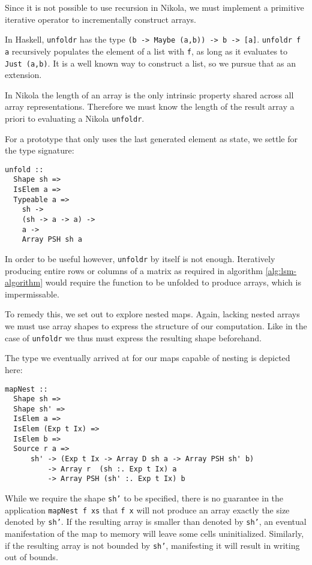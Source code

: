 Since it is not possible to use recursion in Nikola, we must implement a
primitive iterative operator to incrementally construct arrays.

In Haskell, \texttt{unfoldr} has the type \texttt{(b -> Maybe (a,b)) -> b ->
[a]}.  \texttt{unfoldr f a} recursively populates the element of a list with
\texttt{f}, as long as it evaluates to \texttt{Just (a,b)}. It is a well known
way to construct a list, so we pursue that as an extension.

In Nikola the length of an array is the only intrinsic property shared across
all array representations. Therefore we must know the length of the result array a
priori to evaluating a Nikola \texttt{unfoldr}.

For a prototype that only uses the last generated element as state, we settle
for the type signature:
\begin{verbatim}
unfold ::
  Shape sh =>
  IsElem a =>
  Typeable a =>
    sh ->
    (sh -> a -> a) ->
    a ->
    Array PSH sh a
\end{verbatim}

In order to be useful however, \texttt{unfoldr} by itself is not enough.
Iteratively producing entire rows or columns of a matrix as required in
algorithm \ref{alg:lsm-algorithm} would require the function to be unfolded to produce
arrays, which is impermissable.

To remedy this, we set out to explore nested maps. Again, lacking nested arrays
we must use array shapes to express the structure of our computation.  Like in
the case of \texttt{unfoldr} we thus must express the resulting shape beforehand.

The type we eventually arrived at for our maps capable of nesting is depicted
here:
\begin{verbatim}
mapNest ::
  Shape sh =>
  Shape sh' =>
  IsElem a =>
  IsElem (Exp t Ix) =>
  IsElem b =>
  Source r a =>
      sh' -> (Exp t Ix -> Array D sh a -> Array PSH sh' b)
          -> Array r  (sh :. Exp t Ix) a
          -> Array PSH (sh' :. Exp t Ix) b
\end{verbatim}

While we require the shape \texttt{sh'} to be specified, there is no guarantee
in the application \texttt{mapNest f xs} that \texttt{f x} will not produce an
array exactly the size denoted by \texttt{sh'}. If the resulting array is
smaller than denoted by \texttt{sh'}, an eventual manifestation of the map to
memory will leave some cells uninitialized. Similarly, if the resulting array
is not bounded by \texttt{sh'}, manifesting it will result in writing out of
bounds.

